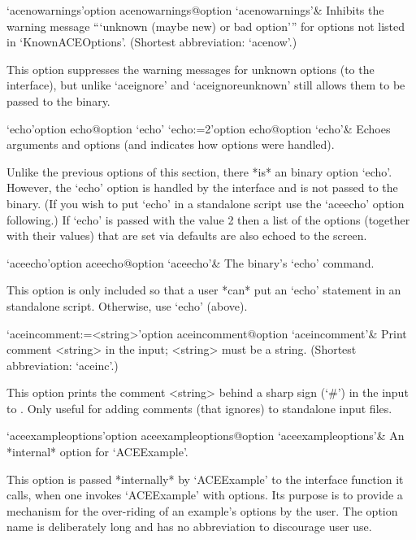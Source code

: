 \>`acenowarnings'{option acenowarnings}@{option `acenowarnings'}& 
Inhibits the warning message ```unknown (maybe new) or bad option'''
for options not listed in `KnownACEOptions'.
(Shortest abbreviation: `acenow'.)

This option suppresses the warning messages for  unknown  options  (to
the {\ACE} interface), but unlike `aceignore'  and  `aceignoreunknown'
still allows them to be passed to the {\ACE} binary.

\>`echo'{option echo}@{option `echo'} 
\>`echo:=2'{option echo}@{option `echo'}& 
Echoes arguments and options (and indicates how options were handled).

Unlike the previous options of this  section,  there  *is*  an  {\ACE}
binary option `echo'. However, the `echo' option  is  handled  by  the
{\ACE} interface and is not passed to the {\ACE} binary. (If you  wish
to put  `echo'  in  a  standalone  script  use  the  `aceecho'  option
following.) If `echo' is passed with the value 2 then a  list  of  the
options (together with their values) that are set via {\ACE}  defaults
are also echoed to the screen.

\>`aceecho'{option aceecho}@{option `aceecho'}& 
The {\ACE} binary's `echo' command.

This option is only included so  that  a  user  *can*  put  an  `echo'
statement in  an  {\ACE}  standalone  script.  Otherwise,  use  `echo'
(above).

\>`aceincomment:=<string>'{option aceincomment}@{option `aceincomment'}&
Print comment <string> in the {\ACE} input; <string> must be a string.
(Shortest abbreviation: `aceinc'.)

This option prints the comment <string> behind a sharp sign (`\#')  in
the input to {\ACE}. Only useful  for  adding  comments  (that  {\ACE}
ignores) to standalone input files.

\>`aceexampleoptions'{option aceexampleoptions}@{option `aceexampleoptions'}&
An *internal* option for `ACEExample'.

This option is passed  *internally*  by  `ACEExample'  to  the  {\ACE}
interface function  it  calls,  when  one  invokes  `ACEExample'  with
options. Its purpose is to provide a mechanism for the over-riding  of
an example's options by the user. The option name is deliberately long
and has no abbreviation to discourage user use.

\enditems


